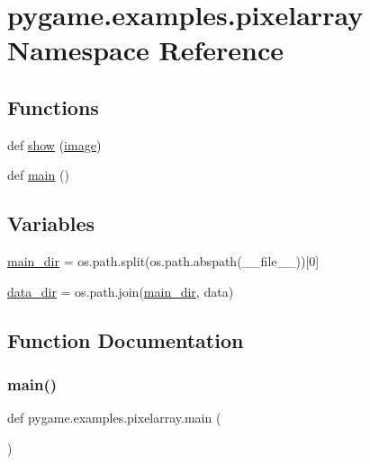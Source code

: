 \hypertarget{namespacepygame_1_1examples_1_1pixelarray}{}\section{pygame.\+examples.\+pixelarray Namespace Reference}
\label{namespacepygame_1_1examples_1_1pixelarray}
\subsection*{Functions}
\begin{DoxyCompactItemize}
\item 
def \hyperlink{namespacepygame_1_1examples_1_1pixelarray_ad7481a0b658c223b91c5314a4cf14129}{show} (\hyperlink{namespacepygame_a0d457af554c5ed9426728f64e80cd688}{image})
\item 
def \hyperlink{namespacepygame_1_1examples_1_1pixelarray_a8835dd2c0c7600be281b9d64584a1aec}{main} ()
\end{DoxyCompactItemize}
\subsection*{Variables}
\begin{DoxyCompactItemize}
\item 
\hyperlink{namespacepygame_1_1examples_1_1pixelarray_a962fa110ecf3f30d9c186f47b872c9cd}{main\+\_\+dir} = os.\+path.\+split(os.\+path.\+abspath(\+\_\+\+\_\+file\+\_\+\+\_\+))\mbox{[}0\mbox{]}
\item 
\hyperlink{namespacepygame_1_1examples_1_1pixelarray_a190e4ec2fc712e73180391824849d648}{data\+\_\+dir} = os.\+path.\+join(\hyperlink{namespacepygame_1_1examples_1_1pixelarray_a962fa110ecf3f30d9c186f47b872c9cd}{main\+\_\+dir}, \textquotesingle{}data\textquotesingle{})
\end{DoxyCompactItemize}


\subsection{Function Documentation}
\mbox{\label{namespacepygame_1_1examples_1_1pixelarray_a8835dd2c0c7600be281b9d64584a1aec}} 
\subsubsection{\texorpdfstring{main()}{main()}}
{\footnotesize\ttfamily def pygame.\+examples.\+pixelarray.\+main (\begin{DoxyParamCaption}{ }\end{DoxyParamCaption})}

